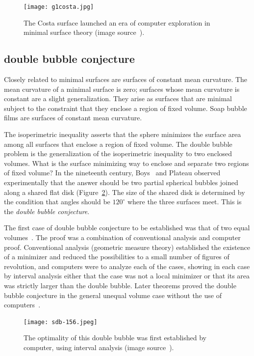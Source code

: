 \documentclass{llncs}
\begin{document}
\begin{figure}[h!]
  \centering
\texttt{[image: g1costa.jpg]}
  \caption{The Costa surface launched an era of computer exploration
in minimal surface theory (image source~\cite{costa}).}
\label{fig:costa}
\end{figure}



\subsection{double bubble conjecture}

Closely related to minimal surfaces are surfaces of constant mean
curvature.  The mean curvature of a minimal surface is zero; surfaces
whose mean curvature is constant are a slight generalization.  They
arise as surfaces that are minimal subject to the constraint that
they enclose a region of fixed volume.  Soap bubble films are
surfaces of constant mean curvature.  

The isoperimetric inequality asserts that the sphere minimizes the
surface area among all surfaces that enclose a region of fixed volume.
The double bubble problem is the generalization of the isoperimetric
inequality to two enclosed volumes.  What is the surface minimizing
way to enclose and separate two regions of fixed volume?  In the
nineteenth century, Boys~\cite{Boy1890} and Plateau observed
experimentally that the answer should be two partial spherical bubbles
joined along a shared flat disk (Figure~\ref{fig:double}).  The size
of the shared disk is determined by the condition that angles should
be $120^\circ$ where the three surfaces meet.  This is the {\it double
  bubble conjecture}.

The first case of double bubble conjecture to be established was that
of two equal volumes~\cite{HHS95}.  The proof was a combination of
conventional analysis and computer proof.  Conventional analysis
(geometric measure theory) established the existence of a minimizer
and reduced the possibilities to a small number of figures of
revolution, and computers were to analyze each of the cases, showing
in each case by interval analysis either that the case was not a local
minimizer or that its area was strictly larger than the double bubble.
Later theorems proved the double bubble conjecture in the general
unequal volume case without the use of computers~\cite{HMRR}.

\begin{figure}[h!]
  \centering
\texttt{[image: sdb-156.jpeg]}
\caption{The optimality of this double bubble was first established by
  computer, using interval analysis (image source~\cite{double}).}
\label{fig:double}
\end{figure}
\end{document}
